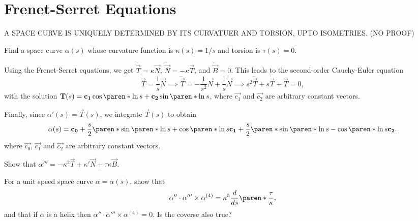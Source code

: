 \documentclass[11pt]{penrose}
\newcommand{\vT}{\vec{T}}
\newcommand{\vN}{\vec{N}}
\newcommand{\vB}{\vec{B}}
\newcommand{\missing}[1]{{\color{red}#1}}
\begin{document}
\section{Frenet-Serret Equations}

\missing{\begin{nthm}
    A SPACE CURVE IS UNIQUELY DETERMINED BY ITS CURVATUER AND TORSION, UPTO ISOMETRIES. (NO PROOF)
\end{nthm}}

\begin{negg}
    Find a space curve $\alpha(s)$ whose curvature function is $\kappa(s) = 1/s$ and torsion is $\tau(s) = 0$.

    Using the Frenet-Serret equations, we get $\dot{\vT} = \kappa \vN$, $\dot{\vN} = - \kappa \vT$, and $\dot{\vB} = 0$. This leads to the second-order Cauchy-Euler equation
    \begin{equation}
        \dot{\vT} = \frac{1}{s} \vN
        \implies
        \ddot{\vT} = -\frac{1}{s^2} \vN + \frac{1}{s} \dot{\vN}
        \implies
        s^2 \ddot{\vT} + s \dot{\vT} + \vT = 0,
    \end{equation}
    with the solution $\vT(s) = \vec{c_1} \cos\paren*{\ln s} + \vec{c_2} \sin\paren*{\ln s}$, where $\vec{c_1}$ and $\vec{c_2}$ are arbitrary constant vectors.

    Finally, since $\alpha'(s) = \vT(s)$, we integrate $\vT(s)$ to obtain
    \begin{equation}
        \alpha(s) = \vec{c_0}
        + \frac{s}{2} \paren*{\sin\paren*{\ln s} + \cos\paren*{\ln s}} \vec{c_1}
        + \frac{s}{2} \paren*{\sin\paren*{\ln s} - \cos\paren*{\ln s}} \vec{c_2}.
    \end{equation}
    where $\vec{c_0}$, $\vec{c_1}$ and $\vec{c_2}$ are arbitrary constant vectors.
\end{negg}

\begin{nex}
    Show that $\alpha''' = -\kappa^2 \vT + \kappa' \vN + \tau\kappa \vB$.
\end{nex}

\begin{nex}
    For a unit speed space curve $\alpha = \alpha(s)$, show that
    \begin{equation}
        \alpha'' \cdot \alpha''' \times \alpha^{(4)} = \kappa^5 \frac{d}{ds}\paren*{\frac{\tau}{\kappa}},
    \end{equation}
    and that if $\alpha$ is a helix then $\alpha'' \cdot \alpha''' \times \alpha^{(4)} = 0$. Is the coverse also true?
\end{nex}
\end{document}
